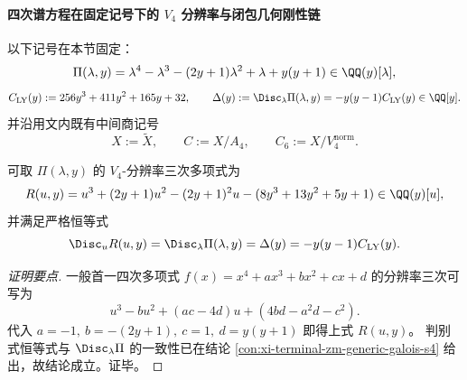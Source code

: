 \paragraph{四次谱方程在固定记号下的 \texorpdfstring{$V_4$}{V4} 分辨率与闭包几何刚性链}
以下记号在本节固定：
\[
\Pi(\lambda,y)=\lambda^4-\lambda^3-(2y+1)\lambda^2+\lambda+y(y+1)\in \QQ(y)[\lambda],
\]
\[
C_{\mathrm{LY}}(y):=256y^3+411y^2+165y+32,\qquad
\Delta(y):=\Disc_{\lambda}\Pi(\lambda,y)=-y(y-1)C_{\mathrm{LY}}(y)\in\QQ[y].
\]
并沿用文内既有中间商记号
\[
X:=\widetilde X,\qquad C:=X/A_4,\qquad C_6:=X/V_4^{\mathrm{norm}}.
\]

\begin{conclusion}\label{con:xi-terminal-zm-v4-resolvent-discriminant-complete-coincidence}
可取 \(\Pi(\lambda,y)\) 的 \(V_4\)-分辨率三次多项式为
\[
R(u,y)=u^3+(2y+1)u^2-(2y+1)^2u-(8y^3+13y^2+5y+1)\in\QQ(y)[u],
\]
并满足严格恒等式
\[
\Disc_u R(u,y)=\Disc_{\lambda}\Pi(\lambda,y)=\Delta(y)=-y(y-1)C_{\mathrm{LY}}(y).
\]
\end{conclusion}
\begin{proof}[证明要点]
一般首一四次多项式
\(
f(x)=x^4+ax^3+bx^2+cx+d
\)
的分辨率三次可写为
\[
u^3-bu^2+(ac-4d)u+(4bd-a^2d-c^2).
\]
代入
\(
a=-1,\ b=-(2y+1),\ c=1,\ d=y(y+1)
\)
即得上式 \(R(u,y)\)。
判别式恒等式与 \(\Disc_{\lambda}\Pi\) 的一致性已在结论 \ref{con:xi-terminal-zm-generic-galois-s4} 给出，故结论成立。证毕。
\end{proof}

